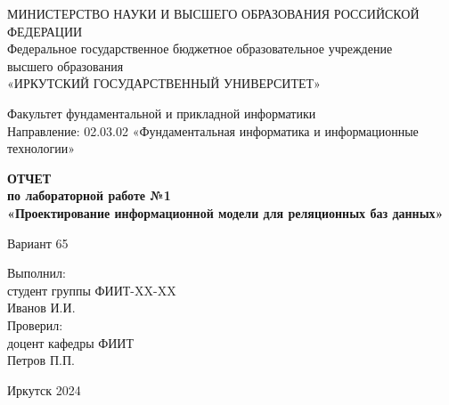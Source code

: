 \documentclass[14pt]{extarticle}
\begin{document}
\begin{titlepage}
    \centering
    {\fontsize{14}{16}\selectfont МИНИСТЕРСТВО НАУКИ И ВЫСШЕГО ОБРАЗОВАНИЯ РОССИЙСКОЙ ФЕДЕРАЦИИ}\\
    {\fontsize{14}{16}\selectfont Федеральное государственное бюджетное образовательное учреждение}\\
    {\fontsize{14}{16}\selectfont высшего образования}\\
    {\fontsize{14}{16}\selectfont «ИРКУТСКИЙ ГОСУДАРСТВЕННЫЙ УНИВЕРСИТЕТ»}\\
    \vspace{1cm}

    {\fontsize{14}{16}\selectfont Факультет фундаментальной и прикладной информатики}\\
    {\fontsize{14}{16}\selectfont Направление: 02.03.02 «Фундаментальная информатика и информационные технологии»}\\
    \vspace{2cm}

    {\fontsize{16}{19}\bfseries ОТЧЕТ}\\
    {\fontsize{16}{19}\bfseries по лабораторной работе №1}\\
    {\fontsize{16}{19}\bfseries «Проектирование информационной модели для реляционных баз данных»}\\
    \vspace{1cm}

    {\fontsize{14}{16}\selectfont Вариант 65}\\
    \vspace{2cm}

    \begin{flushright}
        {\fontsize{14}{16}\selectfont Выполнил:}\\
        {\fontsize{14}{16}\selectfont студент группы ФИИТ-XX-XX}\\
        {\fontsize{14}{16}\selectfont Иванов И.И.}\\
        \vspace{0.5cm}
        {\fontsize{14}{16}\selectfont Проверил:}\\
        {\fontsize{14}{16}\selectfont доцент кафедры ФИИТ}\\
        {\fontsize{14}{16}\selectfont Петров П.П.}\\
    \end{flushright}
    \vfill

    {\fontsize{14}{16}\selectfont Иркутск 2024}
\end{titlepage}
\end{document}
